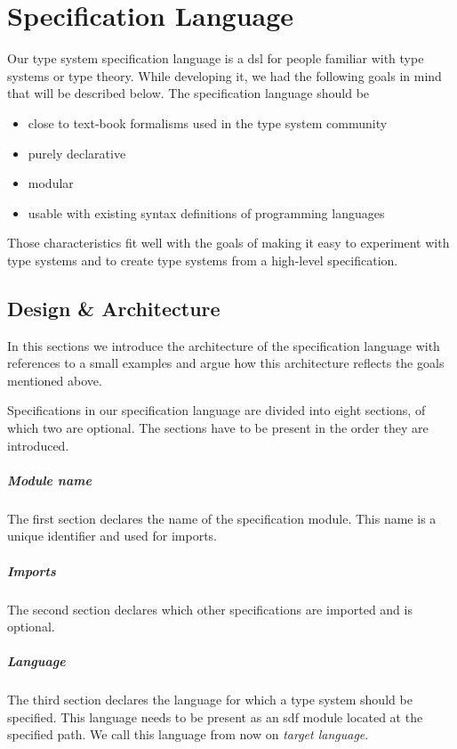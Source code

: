 \chapter{Specification Language}
\label{cha:spec-lang}
Our type system specification language is a \gls{dsl} for people
familiar with type systems or type theory. While developing it, we had
the following goals in mind that will be described below. The
specification language should be

\begin{itemize}
\item close to text-book formalisms used in the type system community
\item purely declarative
\item modular
\item usable with existing syntax definitions of programming languages
\end{itemize}

Those characteristics fit well with the goals of making it easy to
experiment with type systems and to create type systems from a
high-level specification.
\section{Design \& Architecture}
\label{sec:design--architecture}
In this sections we introduce the architecture of the specification
language with references to a small examples and argue how this
architecture reflects the goals mentioned above.

Specifications in our specification language are divided into eight
sections, of which two are optional. The sections have to be present
in the order they are introduced.

\paragraph{Module name} The first section declares the name of the
specification module. This name is a unique identifier and used for
imports.

\paragraph{Imports} The second section declares which other
specifications are imported and is optional.

\paragraph{Language} The third section declares the language for which
a type system should be specified. This language needs to be present
as an \gls{sdf} module located at the specified path. We call this
language from now on \emph{target language}.

